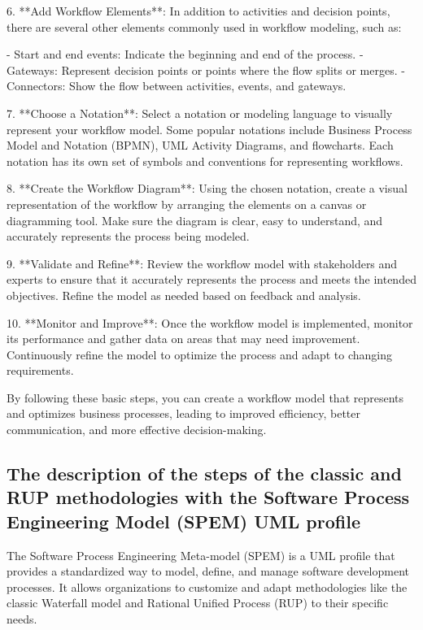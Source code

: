 \documentclass{article}
\begin{document}
6. **Add Workflow Elements**: In addition to activities and decision points, there are several other elements commonly used in workflow modeling, such as:

   - Start and end events: Indicate the beginning and end of the process.
   - Gateways: Represent decision points or points where the flow splits or merges.
   - Connectors: Show the flow between activities, events, and gateways.

7. **Choose a Notation**: Select a notation or modeling language to visually represent your workflow model. Some popular notations include Business Process Model and Notation (BPMN), UML Activity Diagrams, and flowcharts. Each notation has its own set of symbols and conventions for representing workflows.

8. **Create the Workflow Diagram**: Using the chosen notation, create a visual representation of the workflow by arranging the elements on a canvas or diagramming tool. Make sure the diagram is clear, easy to understand, and accurately represents the process being modeled.

9. **Validate and Refine**: Review the workflow model with stakeholders and experts to ensure that it accurately represents the process and meets the intended objectives. Refine the model as needed based on feedback and analysis.

10. **Monitor and Improve**: Once the workflow model is implemented, monitor its performance and gather data on areas that may need improvement. Continuously refine the model to optimize the process and adapt to changing requirements.

By following these basic steps, you can create a workflow model that represents and optimizes business processes, leading to improved efficiency, better communication, and more effective decision-making.



\subsection{The description of the steps of the classic and RUP methodologies with the Software Process Engineering Model (SPEM) UML profile}

The Software Process Engineering Meta-model (SPEM) is a UML profile that provides a standardized way to model, define, and manage software development processes. It allows organizations to customize and adapt methodologies like the classic Waterfall model and Rational Unified Process (RUP) to their specific needs.
\end{document}
